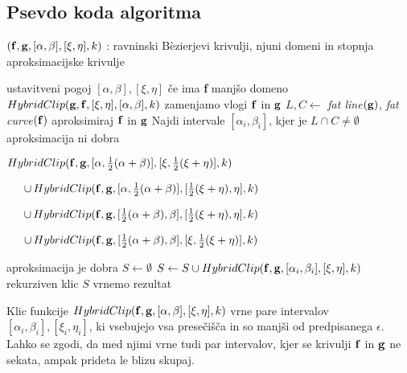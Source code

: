 
\subsection{Psevdo koda algoritma}\text{}
\smallskip
\begin{small}
   \begin{algorithmic}[1]
	\Require $({\bf f},{\bf g}, [\alpha,\beta], [\xi,\eta], k)$ : ravninski B\`{e}zierjevi krivulji, njuni domeni in stopnja aproksimacijske krivulje

	 \hfill ustavitveni pogoj
		\State \Return $[\alpha,\beta],[\xi,\eta]$
	\Else
		\If{$|\alpha - \beta | < |\xi - \eta|$} \hfill če ima {\bf f} manjšo domeno
			\State $HybridClip( {\bf g}, {\bf f}, [\xi,\eta],[\alpha,\beta],k)$ 
			\hfill zamenjamo vlogi ${\bf f}$ in ${\bf g}$
		\Else
			\State $L, C \gets $ {\em fat line}$({\bf g})$, {\em fat curve}$({\bf f})$ 
			\hfill aproksimiraj ${\bf f}$ in ${\bf g}$
			\State Najdi intervale $[\alpha _i,\beta _i]$, kjer je $L\cap C\neq \emptyset$
			 \hfill  aproksimacija ni dobra
				\State \Return \begin{varwidth}[t]{\linewidth}  
					$HybridClip({\bf f},{\bf g},[\alpha,\frac{1}{2}(\alpha+\beta)],[\xi,\frac{1}{2}(\xi+\eta)],k)$\par $ 
        \hskip\algorithmicindent
					\cup \, HybridClip({\bf f},{\bf g},[\alpha,\frac{1}{2}(\alpha+\beta)],[\frac{1}{2}(\xi+\eta), \eta],k)$\par$
        \hskip\algorithmicindent
					\cup \, HybridClip({\bf f},{\bf g},[\frac{1}{2}(\alpha+\beta), \beta],[\frac{1}{2}(\xi+\eta), \eta],k)$\par$
        \hskip\algorithmicindent
					\cup \, HybridClip({\bf f},{\bf g},[\frac{1}{2}(\alpha+\beta), \beta],[\xi, \frac{1}{2}(\xi+\eta)],k)$
					\end{varwidth}
			\Else \hfill  aproksimacija je dobra
				\State $S\gets \emptyset$
					\State $S\gets S\cup HybridClip({\bf f},{\bf g},[\alpha _i,\beta _i], [\xi,\eta],k)$
					\hfill rekurziven klic
				\EndFor
				\State \Return $S$ \hfill vrnemo rezultat
			\EndIf
		\EndIf
	\EndIf
   \end{algorithmic}
\end{small}
\smallskip

Klic funkcije $HybridClip({\bf f},{\bf g}, [\alpha,\beta],[\xi,\eta],k)$ vrne pare intervalov $[\alpha_i,\beta_i], [\xi_i,\eta_i]$, ki vsebujejo vsa presečišča in so manjši od predpisanega $\epsilon$. Lahko se zgodi, da med njimi vrne tudi par intervalov, kjer se krivulji ${\bf f }$ in ${\bf g}$ ne sekata, ampak prideta le blizu skupaj.
